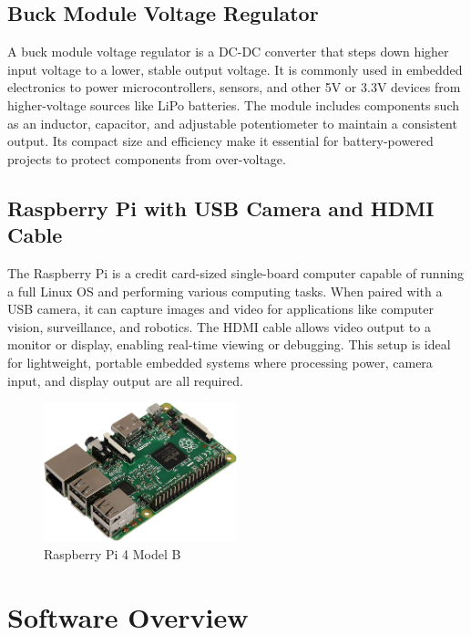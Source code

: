 \subsection{Buck Module Voltage Regulator}
A buck module voltage regulator is a DC-DC converter that steps down higher input voltage to a lower, stable output voltage. It is commonly used in embedded electronics to power microcontrollers, sensors, and other 5V or 3.3V devices  from higher-voltage sources like LiPo batteries. The module includes components such as an inductor, capacitor, and adjustable potentiometer to maintain a consistent output. Its compact size and efficiency make it essential for battery-powered projects to protect components from over-voltage.

\subsection{Raspberry Pi with USB Camera and HDMI Cable}
The Raspberry Pi is a credit card-sized single-board computer capable of running a full Linux OS and performing various computing tasks. When paired with a USB camera, it can capture images and video for applications like computer vision, surveillance, and robotics. The HDMI cable allows video output to a monitor or display, enabling real-time viewing or debugging. This setup is ideal for lightweight, portable embedded systems where processing power, camera input, and display output are all required.
\begin{figure}
\centering
\includegraphics[width=0.5\textwidth]{images/raspimg.jpg}
\caption{Raspberry Pi 4 Model B}

\end{figure}

\section{Software Overview}

